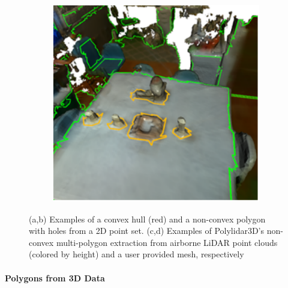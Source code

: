 \begin{figure}[t]
\begin{subfigure}[t]{.26\linewidth}
    \caption{\label{fig:ch1_rooftop_polygon}}
  \end{subfigure}
  \begin{subfigure}[t]{.26\linewidth}
    \centering\includegraphics[width=.95\linewidth]{chapter_1_intro/imgs/mesh_example_simple.pdf}
    \caption{\label{fig:ch1_mesh_polygon}}
  \end{subfigure}
  \caption[Illustration of various polygons]{(a,b) Examples of a convex hull (red) and a non-convex polygon with holes from a 2D point set. (c,d) Examples of Polylidar3D's non-convex multi-polygon extraction from airborne LiDAR point clouds (colored by height) and a user provided mesh, respectively}\label{fig:ch1_polygon_examples}
\end{figure}


\paragraph{Polygons from 3D Data}

